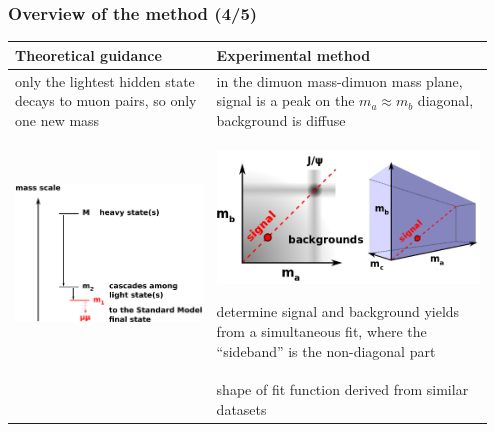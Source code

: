 \documentclass[compress]{beamer}
\begin{document}
\begin{frame}
\frametitle{Overview of the method (4/5)}

\renewcommand{\arraystretch}{1.7}
\begin{tabular}{p{0.4\linewidth} | p{0.55\linewidth}}
Theoretical guidance & Experimental method \\\hline

only the lightest hidden state decays to muon pairs, so only one new mass & in the dimuon mass-dimuon mass plane, signal is a peak on the $m_a \approx m_b$ diagonal, background is diffuse \\

\includegraphics[width=\linewidth]{basic_picture4.pdf} & 
\includegraphics[width=\linewidth]{diagonal.png}

determine signal and background yields from a simultaneous fit, where the ``sideband'' is the non-diagonal part \\

& shape of fit function derived from similar datasets
\end{tabular}
\end{frame}
\end{document}
